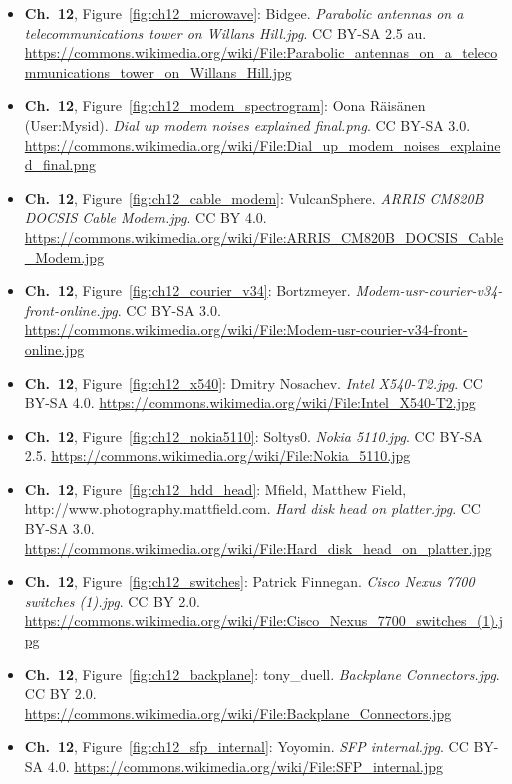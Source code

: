 \begin{small}
\begin{itemize}[leftmargin=0pt,itemsep=2pt,label={}]
\item \textbf{Ch.~12}, Figure~\ref{fig:ch12_microwave}: Bidgee. \emph{Parabolic antennas on a telecommunications tower on Willans Hill.\allowbreak{}jpg}. CC BY-SA 2.5 au. \url{https://commons.wikimedia.org/wiki/File:Parabolic_antennas_on_a_telecommunications_tower_on_Willans_Hill.jpg}
\item \textbf{Ch.~12}, Figure~\ref{fig:ch12_modem_spectrogram}: Oona Räisänen (User:Mysid). \emph{Dial up modem noises explained final.\allowbreak{}png}. CC BY-SA 3.0. \url{https://commons.wikimedia.org/wiki/File:Dial_up_modem_noises_explained_final.png}
\item \textbf{Ch.~12}, Figure~\ref{fig:ch12_cable_modem}: VulcanSphere. \emph{ARRIS CM820B DOCSIS Cable Modem.\allowbreak{}jpg}. CC BY 4.0. \url{https://commons.wikimedia.org/wiki/File:ARRIS_CM820B_DOCSIS_Cable_Modem.jpg}
\item \textbf{Ch.~12}, Figure~\ref{fig:ch12_courier_v34}: Bortzmeyer. \emph{Modem-\allowbreak{}usr-\allowbreak{}courier-\allowbreak{}v34-\allowbreak{}front-\allowbreak{}online.\allowbreak{}jpg}. CC BY-SA 3.0. \url{https://commons.wikimedia.org/wiki/File:Modem-usr-courier-v34-front-online.jpg}
\item \textbf{Ch.~12}, Figure~\ref{fig:ch12_x540}: Dmitry Nosachev. \emph{Intel X540-\allowbreak{}T2.\allowbreak{}jpg}. CC BY-SA 4.0. \url{https://commons.wikimedia.org/wiki/File:Intel_X540-T2.jpg}
\item \textbf{Ch.~12}, Figure~\ref{fig:ch12_nokia5110}: Soltys0. \emph{Nokia 5110.\allowbreak{}jpg}. CC BY-SA 2.5. \url{https://commons.wikimedia.org/wiki/File:Nokia_5110.jpg}
\item \textbf{Ch.~12}, Figure~\ref{fig:ch12_hdd_head}: Mfield, Matthew Field, http://www.photography.mattfield.com. \emph{Hard disk head on platter.\allowbreak{}jpg}. CC BY-SA 3.0. \url{https://commons.wikimedia.org/wiki/File:Hard_disk_head_on_platter.jpg}
\item \textbf{Ch.~12}, Figure~\ref{fig:ch12_switches}: Patrick Finnegan. \emph{Cisco Nexus 7700 switches (1).\allowbreak{}jpg}. CC BY 2.0. \url{https://commons.wikimedia.org/wiki/File:Cisco_Nexus_7700_switches_(1).jpg}
\item \textbf{Ch.~12}, Figure~\ref{fig:ch12_backplane}: tony\_duell. \emph{Backplane Connectors.\allowbreak{}jpg}. CC BY 2.0. \url{https://commons.wikimedia.org/wiki/File:Backplane_Connectors.jpg}
\item \textbf{Ch.~12}, Figure~\ref{fig:ch12_sfp_internal}: Yoyomin. \emph{SFP internal.\allowbreak{}jpg}. CC BY-SA 4.0. \url{https://commons.wikimedia.org/wiki/File:SFP_internal.jpg}

\end{itemize}
\end{small}
